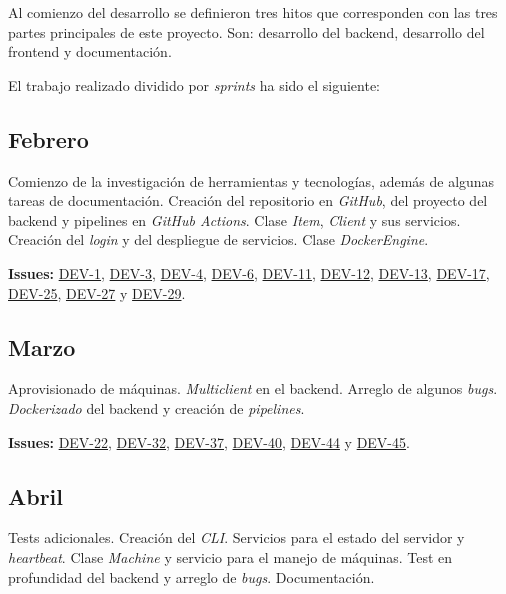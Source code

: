 Al comienzo del desarrollo se definieron tres hitos que corresponden con las tres partes principales de este proyecto. Son: desarrollo del backend, desarrollo del frontend y documentación.

\bigskip
El trabajo realizado dividido por \textit{sprints} ha sido el siguiente:

\subsection{Febrero}
Comienzo de la investigación de herramientas y tecnologías, además de algunas tareas de documentación. Creación del repositorio en \textit{GitHub}, del proyecto del backend y pipelines en \textit{GitHub Actions}. Clase \textit{Item}, \textit{Client} y sus servicios. Creación del \textit{login} y del despliegue de servicios. Clase \textit{DockerEngine}.

\bigskip
\textbf{Issues:} \href{https://github.com/harvestcore/tfg/issues/1}{DEV-1}, \href{https://github.com/harvestcore/tfg/issues/3}{DEV-3}, \href{https://github.com/harvestcore/tfg/issues/4}{DEV-4}, \href{https://github.com/harvestcore/tfg/issues/6}{DEV-6}, \href{https://github.com/harvestcore/tfg/issues/11}{DEV-11}, \href{https://github.com/harvestcore/tfg/issues/12}{DEV-12}, \href{https://github.com/harvestcore/tfg/issues/13}{DEV-13}, \href{https://github.com/harvestcore/tfg/issues/17}{DEV-17}, \href{https://github.com/harvestcore/tfg/issues/25}{DEV-25}, \href{https://github.com/harvestcore/tfg/issues/27}{DEV-27} y \href{https://github.com/harvestcore/tfg/issues/29}{DEV-29}.


\subsection{Marzo}
Aprovisionado de máquinas. \textit{Multiclient} en el backend. Arreglo de algunos \textit{bugs}. \textit{Dockerizado} del backend y creación de \textit{pipelines}.

\bigskip
\textbf{Issues:} \href{https://github.com/harvestcore/tfg/issues/22}{DEV-22},  \href{https://github.com/harvestcore/tfg/issues/32}{DEV-32},  \href{https://github.com/harvestcore/tfg/issues/37}{DEV-37},  \href{https://github.com/harvestcore/tfg/issues/40}{DEV-40},  \href{https://github.com/harvestcore/tfg/issues/44}{DEV-44} y  \href{https://github.com/harvestcore/tfg/issues/45}{DEV-45}. 


\subsection{Abril}
Tests adicionales. Creación del \textit{CLI}. Servicios para el estado del servidor y \textit{heartbeat}. Clase \textit{Machine} y servicio para el manejo de máquinas. Test en profundidad del backend y arreglo de \textit{bugs}. Documentación.

